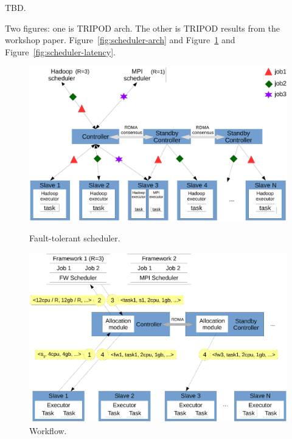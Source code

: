 TBD.

Two figures: one is TRIPOD arch. The other is TRIPOD results from the workshop 
paper. Figure~\ref{fig:scheduler-arch} and Figure~\ref{fig:scheduler-workflow} 
and Figure~\ref{fig:scheduler-latency}.

\begin{figure}[!htb]
    \begin{minipage}{.49\textwidth}
        \includegraphics[width=0.34\textheight]{figures/scheduler_arch.ps}
        \vspace{0.1in}
        \caption{Fault-tolerant scheduler.}
        \label{fig:scheduler-arch}
    \end{minipage}
    \begin{minipage}{0.51\textwidth}
        \includegraphics[width=0.34\textheight]{figures/scheduler_flow.ps}
        \vspace{0.1in}
        \caption{Workflow.}
        \label{fig:scheduler-workflow}
    \end{minipage}
\end{figure}

